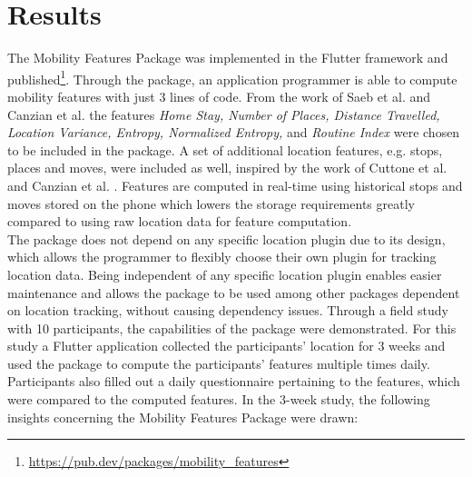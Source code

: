 \section{Results}
The Mobility Features Package was implemented in the Flutter framework and published\footnote{\url{https://pub.dev/packages/mobility_features}}. Through the package, an application programmer is able to compute mobility features with just 3 lines of code. From the work of Saeb et al. \cite{Saeb2015} and Canzian et al. \cite{Canzian2015} the features \textit{Home Stay, Number of Places, Distance Travelled, Location Variance, Entropy, Normalized Entropy,} and \textit{Routine Index} were chosen to be included in the package. A set of additional location features, e.g. stops, places and moves, were included as well, inspired by the work of Cuttone et al. \cite{sparse-location-2014} and Canzian et al. \cite{Canzian2015}. Features are computed in real-time using historical stops and moves stored on the phone which lowers the storage requirements greatly compared to using raw location data for feature computation.\\

The package does not depend on any specific location plugin due to its design, which allows the programmer to flexibly choose their own plugin for tracking location data. Being independent of any specific location plugin enables easier maintenance and allows the package to be used among other packages dependent on location tracking, without causing dependency issues. Through a field study with 10 participants, the capabilities of the package were demonstrated. For this study a Flutter application collected the participants' location for 3 weeks and used the package to compute the participants' features multiple times daily. Participants also filled out a daily questionnaire pertaining to the features, which were compared to the computed features. In the 3-week study, the following insights concerning the Mobility Features Package were drawn:

